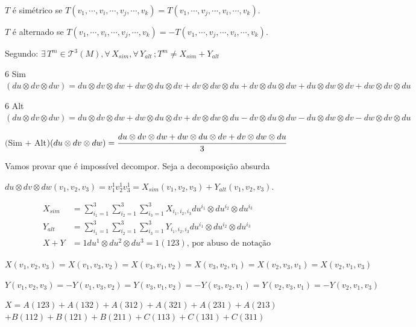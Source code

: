 \documentclass[10pt,a4paper]{article}
\begin{document}
		$T$ \'e sim\'etrico se $T(v_1, \cdots, v_i, \cdots, v_j, \cdots, v_k) = T(v_1, \cdots, v_j, \cdots, v_i, \cdots, v_k)$.

		$T$ \'e alternado se $T(v_1, \cdots, v_i, \cdots, v_j, \cdots, v_k) = - T(v_1, \cdots, v_j, \cdots, v_i, \cdots, v_k)$.

		\vspace{3mm}

		Segundo: $\exists\, T^m \in \mathcal{T}^3(M), \forall\, X_{sim}, \forall\, Y_{alt}\,; T^m \ne X_{sim} + Y_{alt}$

		$6$ Sim $(du \otimes dv \otimes dw) = du \otimes dv \otimes dw + dw \otimes du \otimes dv + dv \otimes dw \otimes du + dv \otimes du \otimes dw + du \otimes dw \otimes dv + dw \otimes dv \otimes du$

		$6$ Alt $(du \otimes dv \otimes dw) = du \otimes dv \otimes dw + dw \otimes du \otimes dv + dv \otimes dw \otimes du - dv \otimes du \otimes dw - du \otimes dw \otimes dv - dw \otimes dv \otimes du$

		$($Sim $+$ Alt$)(du \otimes dv \otimes dw) = \cfrac{du \otimes dv \otimes dw + dw \otimes du \otimes dv + dv \otimes dw \otimes du}{3}$

		Vamos provar que \'e imposs\'ivel decompor. Seja a decomposi\c{c}\~ao absurda

		$du \otimes dv \otimes dw(v_1, v_2, v_3) = v_1^1 v_2^1 v_3^1 = X_{sim}(v_1, v_2, v_3) + Y_{alt}(v_1, v_2, v_3)$.

		\begin{align*}
		X_{sim} &= \sum_{i_1 = 1}^3 \sum_{i_2 = 1}^3 \sum_{i_3 = 1}^3 X_{i_1, i_2, i_3} du^{i_1} \otimes du^{i_2} \otimes du^{i_3} \\
		Y_{alt} &= \sum_{i_1 = 1}^3 \sum_{i_2 = 1}^3 \sum_{i_3 = 1}^3 Y_{i_1, i_2, i_3} du^{i_1} \otimes du^{i_2} \otimes du^{i_3} \\
		X + Y &= 1 du^1 \otimes du^2 \otimes du^3 = 1(123)\text{, por abuso de nota\c{c}\~ao}
		\end{align*}

		$X(v_1, v_2, v_3) = X(v_1, v_3, v_2) = X(v_3, v_1, v_2) = X(v_3, v_2, v_1) = X(v_2, v_3, v_1) = X(v_2, v_1, v_3)$

		$Y(v_1, v_2, v_3) = - Y(v_1, v_3, v_2) = Y(v_3, v_1, v_2) = - Y(v_3, v_2, v_1) = Y(v_2, v_3, v_1) = - Y(v_2, v_1, v_3)$

		\vspace{3mm}

		$X = A(123) + A(132) + A(312) + A(321) + A(231) + A(213)$
		$ + B(112) + B(121) + B(211) + C(113) + C(131) + C(311)$
\end{document}
